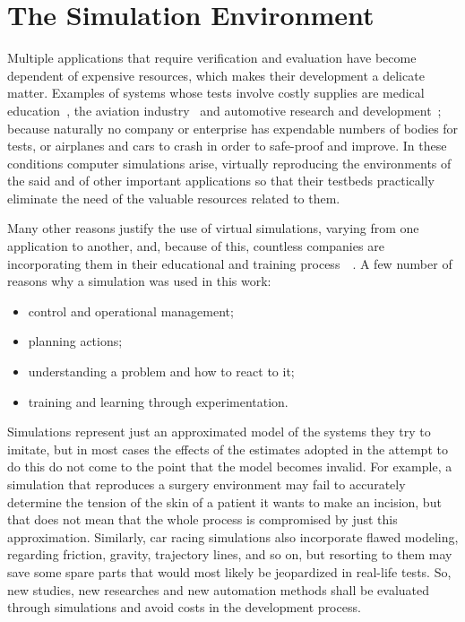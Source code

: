 \section{\textbf{The Simulation Environment}} \label{sec:Environment}

	Multiple applications that require verification and evaluation have become dependent of expensive resources, which makes their development a delicate matter. Examples of systems whose tests involve costly supplies are medical education~\cite{MEDIC}, the aviation industry~\cite{AIR} and automotive research and development~\cite{AUTR}; because naturally no company or enterprise has expendable numbers of bodies for tests, or airplanes and cars to crash in order to safe-proof and improve. In these conditions computer simulations arise, virtually reproducing the environments of the said and of other important applications so that their testbeds practically eliminate the need of the valuable resources related to them.
	
	Many other reasons justify the use of virtual simulations, varying from one application to another, and, because of this, countless companies are incorporating them in their educational and training process~\cite{Simulation}~\cite{Operator}. A few number of reasons why a simulation was used in this work:
	
	\begin{itemize}
		
		\item control and operational management;
		
		\item planning actions;
		
		\item understanding a problem and how to react to it;
		
		\item training and learning through experimentation.
		
	\end{itemize}
	
	Simulations represent just an approximated model of the systems they try to imitate, but in most cases the effects of the estimates adopted in the attempt to do this do not come to the point that the model becomes invalid. For example, a simulation that reproduces a surgery environment may fail to accurately determine the tension of the skin of a patient it wants to make an incision, but that does not mean that the whole process is compromised by just this approximation. Similarly, car racing simulations also incorporate flawed modeling, regarding friction, gravity, trajectory lines, and so on, but resorting to them may save some spare parts that would most likely be jeopardized in real-life tests. So, new studies, new researches and new automation methods shall be evaluated through simulations and avoid costs in the development process.
	
